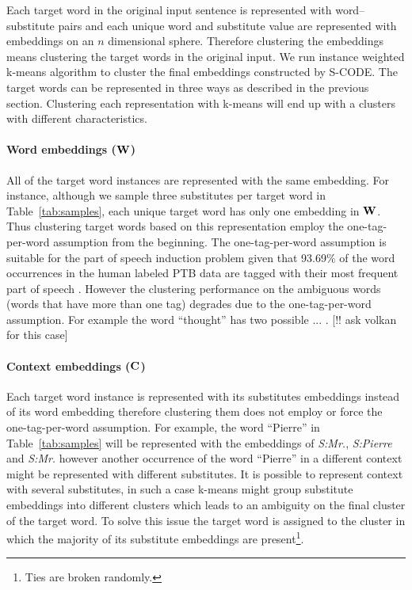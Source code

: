 Each target word in the original input sentence is represented with
word--substitute pairs and each unique word and substitute value are
represented with embeddings on an $n$ dimensional sphere.  Therefore
clustering the embeddings means clustering the target words in the
original input.  We run instance weighted k-means algorithm to cluster
the final embeddings constructed by S-CODE.  The target words can be
represented in three ways as described in the previous section.
Clustering each representation with k-means will end up with a
clusters with different characteristics.

\paragraph{Word embeddings (${\bf W}$)} All of the target word instances
are represented with the same embedding.  For instance, although we
sample three substitutes per target word in Table~\ref{tab:samples},
each unique target word has only one embedding in ${\bf W}$.  Thus
clustering target words based on this representation employ the
one-tag-per-word assumption from the beginning.  The one-tag-per-word
assumption is suitable for the part of speech induction problem given
that 93.69\% of the word occurrences in the human labeled PTB data are
tagged with their most frequent part of speech
\cite{Toutanova:2003:FPT:1073445.1073478}.  However the clustering
performance on the ambiguous words (words that have more than one tag)
degrades due to the one-tag-per-word assumption.  For example the word
``thought'' has two possible ... . [!! ask volkan for this case]

\paragraph{Context embeddings (${\bf C}$)} 
Each target word instance is represented with its substitutes
embeddings instead of its word embedding therefore clustering them
does not employ or force the one-tag-per-word assumption.  For
example, the word ``Pierre'' in Table~\ref{tab:samples} will be
represented with the embeddings of {\it S:Mr.}, {\it S:Pierre} and
{\it S:Mr.}  however another occurrence of the word ``Pierre'' in a
different context might be represented with different substitutes.  It
is possible to represent context with several substitutes, in such a
case k-means might group substitute embeddings into different clusters
which leads to an ambiguity on the final cluster of the target word.
To solve this issue the target word is assigned to the cluster in
which the majority of its substitute embeddings are
present\footnote{Ties are broken randomly.}.

